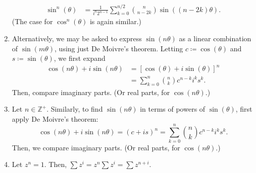\documentclass[oneside]{book}
\begin{document}
\begin{note}
\begin{enumerate}
\begin{align*}
      \sin^n(\theta) &= \frac{1}{i^n2^{n-1}}\sum_{k=0}^{n/2}{\binom{n}{n-2k}\sin((n-2k)\theta)}.
    \end{align*}
    (The case for \(\cos^n(\theta)\) is again similar.)
    \item Alternatively, we may be asked to express \(\sin(n\theta)\) as a linear combination of \(\sin(m\theta)\), using just De Moivre's theorem. Letting \(c\coloneq\cos(\theta)\) and \(s\coloneq\sin(\theta)\), we first expand
    \begin{align*}
      \cos(n\theta)+i\sin(n\theta) &= [\cos(\theta)+i\sin(\theta)]^n\\
      &= \sum_{k=0}^{n}{\binom{n}{k}c^{n-k}i^{k}s^{k}}.
    \end{align*}
    Then, compare imaginary parts. (Or real parts, for \(\cos(n\theta)\).)
    \item Let \(n\in \mathbb{Z}^{+}\). Similarly, to find \(\sin(n\theta)\) in terms of powers of \(\sin(\theta)\), first apply De Moivre's theorem:
    \[\cos(n\theta)+i\sin(n\theta)=(c+is)^n=\sum_{k=0}^{n}{\binom{n}{k}c^{n-k}i^ks^k}.\]
    Then, we compare imaginary parts. (Or real parts, for \(\cos(n\theta)\).)
    \item Let \(z^n=1\). Then, \(\sum{z^i}=z^n\sum{z^i}=\sum{z^{n+i}}\).
  \end{enumerate}
\end{note}
\end{document}
